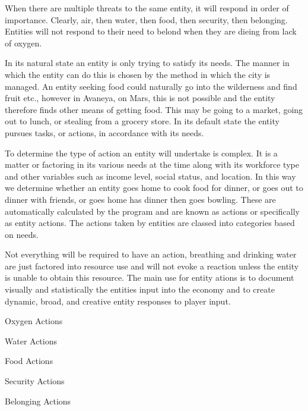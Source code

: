 When there are multiple threats to the same entity, it will respond in order of importance. Clearly, air, then water, then food, then security, then belonging. Entities will not respond to their need to belond when they are dieing from lack of oxygen.

In its natural state an entity is only trying to satisfy its needs. The manner in which the entity can do this is chosen by the method in which the city is managed. An entity seeking food could naturally go into the wilderness and find fruit etc., however in Avaneya, on Mars, this is not possible and the entity therefore finds other means of getting food. This may be going to a market, going out to lunch, or stealing from a grocery store. In its default state the entity pursues tasks, or actions, in accordance with its needs.

To determine the type of action an entity will undertake is complex. It is a matter or factoring in its various needs at the time along with its workforce type and other variables such as income level, social status, and location. In this way we determine whether an entity goes home to cook food for dinner, or goes out to dinner with friends, or goes home has dinner then goes bowling. These are automatically calculated by the program and are known as actions or specifically as entity actions. The actions taken by entities are classed into categories based on needs. 

Not everything will be required to have an action, breathing and drinking water are just factored into resource use and will not evoke a reaction unless the entity is unable to obtain this resource. The main use for entity ations is to document visually and statistically the entities input into the economy and to create dynamic, broad, and creative entity responses to player input.

Oxygen Actions


Water Actions



Food Actions



Security Actions



Belonging Actions








 



